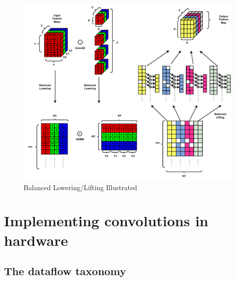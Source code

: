 \begin{figure}[!ht]
    \centering
    \includegraphics[scale=0.6]{fig/BalancedLoweringLifting.pdf}
    \caption{Balanced Lowering/Lifting Illustrated}
    \label{fig:balanced_lowering_lifting}
\end{figure}


\section{Implementing convolutions in hardware}
\subsection{The dataflow taxonomy}

